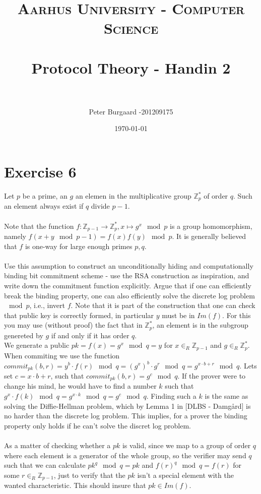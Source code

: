 \documentclass[paper=a4, fontsize=11pt]{scrartcl} %
\title{	
	\normalfont \normalsize 
	\textsc{Aarhus University - Computer Science} \\ [25pt] %
	\horrule{0.5pt} \\[0.4cm] %
	\huge Protocol Theory - Handin 2 \\ %
	\horrule{2pt} \\[0.5cm] %
}
\author{Peter Burgaard -201209175} %
\date{\normalsize\today} %
\numberwithin{equation}{section} %
\numberwithin{figure}{section} %
\numberwithin{table}{section} %
\begin{document}
	
	\maketitle %
	
	\section*{Exercise 6}
	
	Let $p$ be a prime, an $g$ an elemen in the multiplicative group $\mathbb{Z}_p^*$ of order $q$. Such an element always exist if $q$ divide $p-1$. \\ \\
	Note that the function $f:\mathbb{Z}_{p-1}\rightarrow \mathbb{Z}_p^*, x\mapsto g^x\mod{p}$ is a group homomorphism, namely $f(x+y\mod{p-1})=f(x)f(y)\mod{p}$. It is generally believed that $f$ is one-way for large enough primes $p,q$. \\ \\
	Use this assumption to construct an unconditionally hiding and computationally binding bit commitment scheme - use the RSA construction as inspiration, and write down the commitment function explicitly. Argue that if one can efficiently break the binding property, one can also efficiently solve the discrete log problem $\mod{p}$, i.e., invert $f$. Note that it is part of the construction that one can check that public key is correctly formed, in particular $y$ must be in $Im(f)$. For this you may use (without proof) the fact that in $\mathbb{Z}_p^*$, an element is in the subgroup genereted by $g$ if and only if it has order $q$. \\
	
	We generate a public $pk=f(x)=g^x\mod{q}=y$ for $x\in_R\mathbb{Z}_{p-1}$ and $g\in_R\mathbb{Z}_p^*$. When commiting we use the function $commit_{pk}(b,r)=y^b\cdot f(r)\mod{q}=(g^x)^b\cdot g^r\mod{q}=g^{x\cdot b+r}\mod{q}$. Lets set $c=x\cdot b+r$, such that $commit_{pk}(b,r)=g^c\mod{q}$. If the prover were to change his mind, he would have to find a number $k$ such that $g^x\cdot f(k)\mod{q}=g^{x\cdot k}\mod{q}=g^c\mod{q}$. Finding such a $k$ is the same as solving the Diffie-Hellman problem, which by Lemma 1 in [DLBS - Damgård] is no harder than the discrete log problem. This implies, for a prover the binding property only holds if he can't solve the discret log problem. \\ \\
	
	As a matter of checking whether a $pk$ is valid, since we map to a group of order $q$ where each element is a generator of the whole group, so the verifier may send $q$ such that we can calculate $pk^q\mod{q}=pk$ and $f(r)^q\mod{q}=f(r)$ for some $r\in_R\mathbb{Z}_{p-1}$, just to verify that the $pk$ isn't a special element with the wanted characteristic. This should insure that $pk\in Im(f)$.
	
\end{document}
